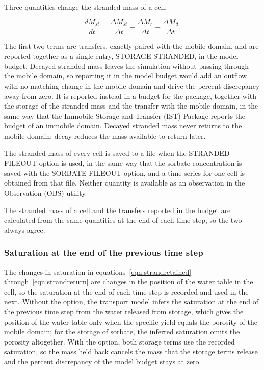 Three quantities change the stranded mass of a cell,

\begin{equation}
\label{eqn:strandbalance}
\frac{d M_{st}}{d t} = \frac{\Delta M_{st}}{\Delta t} - \frac{\Delta M_r}{\Delta t} - \frac{\Delta M_d}{\Delta t} .
\end{equation}

The first two terms are transfers, exactly paired with the mobile domain, and are reported together as a single entry, STORAGE-STRANDED, in the model budget. Decayed stranded mass leaves the simulation without passing through the mobile domain, so reporting it in the model budget would add an outflow with no matching change in the mobile domain and drive the percent discrepancy away from zero. It is reported instead in a budget for the package, together with the storage of the stranded mass and the transfer with the mobile domain, in the same way that the Immobile Storage and Transfer (IST) Package reports the budget of an immobile domain. Decayed stranded mass never returns to the mobile domain; decay reduces the mass available to return later.

The stranded mass of every cell is saved to a file when the STRANDED FILEOUT option is used, in the same way that the sorbate concentration is saved with the SORBATE FILEOUT option, and a time series for one cell is obtained from that file. Neither quantity is available as an observation in the Observation (OBS) utility.

The stranded mass of a cell and the transfers reported in the budget are calculated from the same quantities at the end of each time step, so the two always agree.

\subsubsection{Saturation at the end of the previous time step}

The changes in saturation in equations~\ref{eqn:strandretained} through~\ref{eqn:strandreturn} are changes in the position of the water table in the cell, so the saturation at the end of each time step is recorded and used in the next. Without the option, the transport model infers the saturation at the end of the previous time step from the water released from storage, which gives the position of the water table only when the specific yield equals the porosity of the mobile domain; for the storage of sorbate, the inferred saturation omits the porosity altogether. With the option, both storage terms use the recorded saturation, so the mass held back cancels the mass that the storage terms release and the percent discrepancy of the model budget stays at zero.


